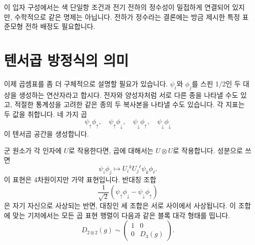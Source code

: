 \begin{classroomqa}
\end{classroomqa}

이 입자 구성에서는 색 단일항 조건과 전기 전하의 정수성이 밀접하게 연결되어 있지만, 수학적으로 같은 명제는 아닙니다. 전하가 정수라는 결론에는 방금 제시한 특정 표준모형 전하 배정도 필요합니다.

\begin{classroomqa}
\end{classroomqa}

\section{텐서곱 방정식의 의미}

이제 곱셈표를 좀 더 구체적으로 설명할 필요가 있습니다. \(\psi_i\)와 \(\phi_j\)를 스핀 1/2인 두 대상을 생성하는 연산자라고 합시다. 전자와 양성자처럼 서로 다른 종을 나타낼 수도 있고, 적절한 통계성을 고려한 같은 종의 두 복사본을 나타낼 수도 있습니다. 각 지표는 두 값을 취합니다. 네 가지 곱
\begin{equation}
\psi_\uparrow\phi_\uparrow,
\quad
\psi_\uparrow\phi_\downarrow,
\quad
\psi_\downarrow\phi_\uparrow,
\quad
\psi_\downarrow\phi_\downarrow
\end{equation}
이 텐서곱 공간을 생성합니다.

군 원소가 각 인자에 \(U\)로 작용한다면, 곱에 대해서는 \(U\otimes U\)로 작용합니다. 성분으로 쓰면
\begin{equation}
\psi_i\phi_j
\longmapsto
U_i{}^kU_j{}^\ell\psi_k\phi_\ell.
\label{eq:l4-product-action}
\end{equation}
이 표현은 4차원이지만 가약 표현입니다. 반대칭 조합
\begin{equation}
\frac{1}{\sqrt2}
(\psi_\uparrow\phi_\downarrow
-\psi_\downarrow\phi_\uparrow)
\end{equation}
은 자기 자신으로 사상되는 반면, 대칭인 세 조합은 서로 사이에서 사상됩니다. 이 조합에 맞는 기저에서는 모든 곱 표현 행렬이 다음과 같은 블록 대각 형태를 띱니다.
\begin{equation}
D_{2\otimes2}(g)
\sim
\begin{pmatrix}
1&0\\
0&D_3(g)
\end{pmatrix}.
\label{eq:l4-spin-block-diagonal}
\end{equation}

